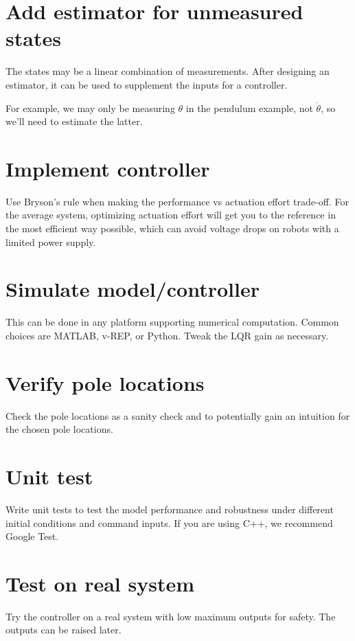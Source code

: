 \section{Add estimator for unmeasured states}

The states may be a linear combination of measurements. After designing an
estimator, it can be used to supplement the inputs for a controller.

For example, we may only be measuring $\theta$ in the pendulum example, not
$\dot{\theta}$, so we'll need to estimate the latter.

\section{Implement controller}

Use Bryson's rule when making the performance vs actuation effort trade-off. For
the average system, optimizing actuation effort will get you to the reference in
the most efficient way possible, which can avoid voltage drops on robots with a
limited power supply.

\section{Simulate model/controller}

This can be done in any platform supporting numerical computation. Common
choices are MATLAB, v-REP, or Python. Tweak the LQR gain as necessary.

\section{Verify pole locations}

Check the pole locations as a sanity check and to potentially gain an intuition
for the chosen pole locations.

\section{Unit test}

Write unit tests to test the \gls{model} performance and \gls{robustness} under
different initial conditions and command inputs. If you are using C++, we
recommend Google Test.

\section{Test on real system}

Try the controller on a real \gls{system} with low maximum outputs for safety.
The outputs can be raised later.
